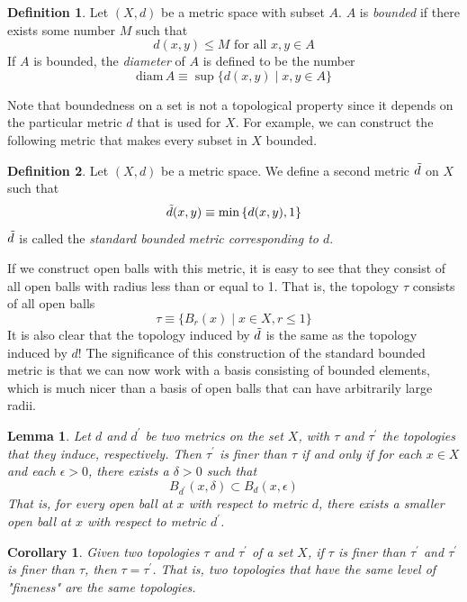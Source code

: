 \documentclass{article}
\newtheorem{lemma}[theorem]{Lemma}
\newtheorem{corollary}{Corollary}[theorem]
\theoremstyle{remark}
\theoremstyle{definition}
\newtheorem{definition}{Definition}[section]
\begin{document}
\begin{definition}
Let $(X, d)$ be a metric space with subset $A$. $A$ is \textit{bounded} if there exists some number $M$ such that
\[d (x, y) \leq M \text{ for all } x,y \in A\]
If $A$ is bounded, the \textit{diameter} of $A$ is defined to be the number
\[\text{diam}\, A \equiv \sup{\{d(x, y) \; | \; x, y \in A\}}\]
\end{definition}

Note that boundedness on a set is not a topological property since it depends on the particular metric $d$ that is used for $X$. For example, we can construct the following metric that makes every subset in $X$ bounded. 

\begin{definition}
Let $(X, d)$ be a metric space. We define a second metric $\Tilde{d}$ on $X$ such that
\[\Tilde{d} (x, y) \equiv \min{\{d(x, y), 1\}}\]
$\Tilde{d}$ is called the \textit{standard bounded metric corresponding to $d$}. 
\end{definition}

If we construct open balls with this metric, it is easy to see that they consist of all open balls with radius less than or equal to 1. That is, the topology $\tau$ consists of all open balls
\[\tau \equiv \{B_r (x) \; | \; x \in X, r \leq 1\}\]
It is also clear that the topology induced by $\Tilde{d}$ is the same as the topology induced by $d$! The significance of this construction of the standard bounded metric is that we can now work with a basis consisting of bounded elements, which is much nicer than a basis of open balls that can have arbitrarily large radii.  

\begin{lemma}
Let $d$ and $d^\prime$ be two metrics on the set $X$, with $\tau$ and $\tau^\prime$ the topologies that they induce, respectively. Then $\tau^\prime$ is finer than $\tau$ if and only if for each $x \in X$ and each $\epsilon > 0$, there exists a $\delta > 0$ such that
\[B_{d^\prime} (x, \delta) \subset B_d (x, \epsilon)\]
That is, for every open ball at $x$ with respect to metric $d$, there exists a smaller open ball at $x$ with respect to metric $d^\prime$. 
\end{lemma}

\begin{corollary}
Given two topologies $\tau$ and $\tau^\prime$ of a set $X$, if $\tau$ is finer than $\tau^\prime$ and $\tau^\prime$ is finer than $\tau$, then $\tau = \tau^\prime$. That is, two topologies that have the same level of "fineness" are the same topologies. 
\end{corollary}
\end{document}

